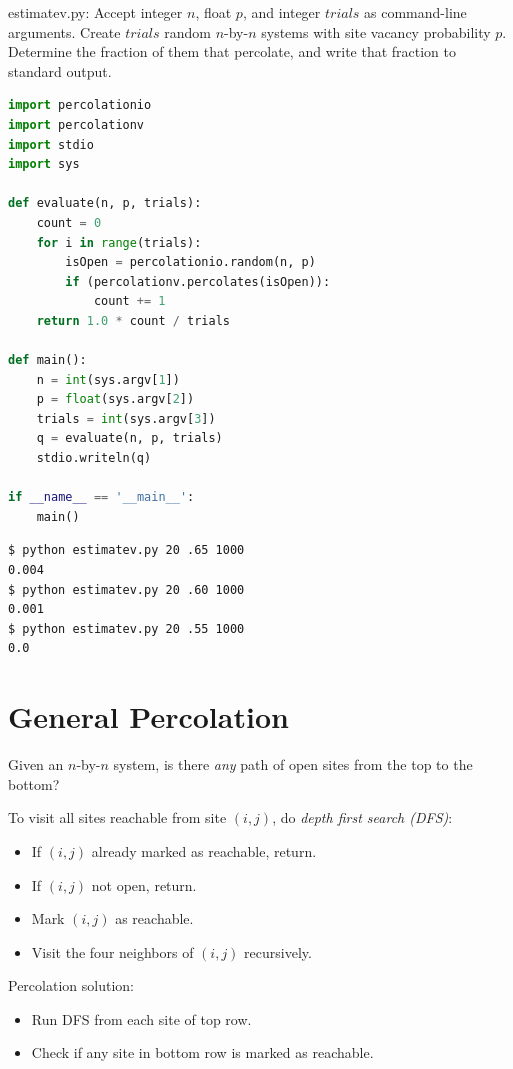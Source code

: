 \documentclass[8pt,a4paper,compress,handout]{beamer}
\begin{document}
\begin{frame}[fragile]
\begin{framed}
\tiny estimatev.py: Accept integer $n$, float $p$, and integer $trials$ as command-line arguments. Create $trials$ random $n$-by-$n$ systems with site vacancy probability $p$. Determine the fraction of them that percolate, and
write that fraction to standard output.
\end{framed}

\begin{lstlisting}[language=Python]
import percolationio
import percolationv
import stdio
import sys

def evaluate(n, p, trials):
    count = 0
    for i in range(trials):
        isOpen = percolationio.random(n, p)
        if (percolationv.percolates(isOpen)):
            count += 1
    return 1.0 * count / trials

def main():
    n = int(sys.argv[1])
    p = float(sys.argv[2])
    trials = int(sys.argv[3])
    q = evaluate(n, p, trials)
    stdio.writeln(q)
    
if __name__ == '__main__': 
    main()
\end{lstlisting}

\begin{lstlisting}[language={}]
$ python estimatev.py 20 .65 1000
0.004
$ python estimatev.py 20 .60 1000
0.001
$ python estimatev.py 20 .55 1000
0.0
\end{lstlisting}
\end{frame}

\section{General Percolation}
\begin{frame}[fragile]
Given an $n$-by-$n$ system, is there \emph{any} path of open sites from the top to the bottom?

\bigskip

To visit all sites reachable from site $(i, j)$, do \emph{depth first search (DFS)}:
\begin{itemize}
\item If $(i, j)$ already marked as reachable, return.
\item If $(i, j)$ not open, return.
\item Mark $(i, j)$ as reachable.
\item Visit the four neighbors of $(i, j)$ recursively.
\end{itemize}

\bigskip

Percolation solution:
\begin{itemize}
\item Run DFS from each site of top row.
\item Check if any site in bottom row is marked as reachable.
\end{itemize}
\end{frame}
\end{document}
